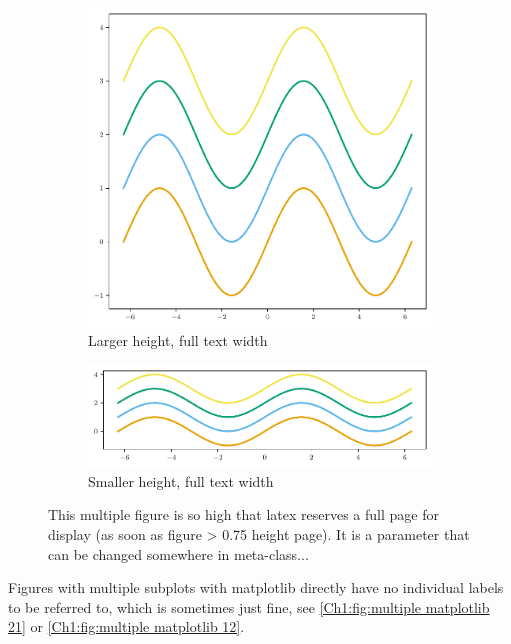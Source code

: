 \begin{figure}
	\centering
	\begin{subfigure}[b]{\textwidth}
		\centering
		\includegraphics{../Chap1/Figure/Figure_simple_larger_height.pdf}
		\caption{Larger height, full text width}
		\label{Ch1:fig:multiple1}
	\end{subfigure}
	\begin{subfigure}[b]{\textwidth}
		\centering
		\includegraphics{../Chap1/Figure/Figure_simple_smaller_height.pdf}
		\caption{Smaller height, full text width}
		\label{Ch1:fig:multiple2}
	\end{subfigure}
	\caption{This multiple figure is so high that latex reserves a full page for display (as soon as figure > 0.75 height page). It is a parameter that can be changed somewhere in meta-class...}
	\label{Ch1:fig:multiple}
\end{figure}

Figures with multiple subplots with matplotlib directly have no individual labels to be referred to, which is sometimes just fine, see \ref{Ch1:fig:multiple matplotlib 21} or \ref{Ch1:fig:multiple matplotlib 12}.

